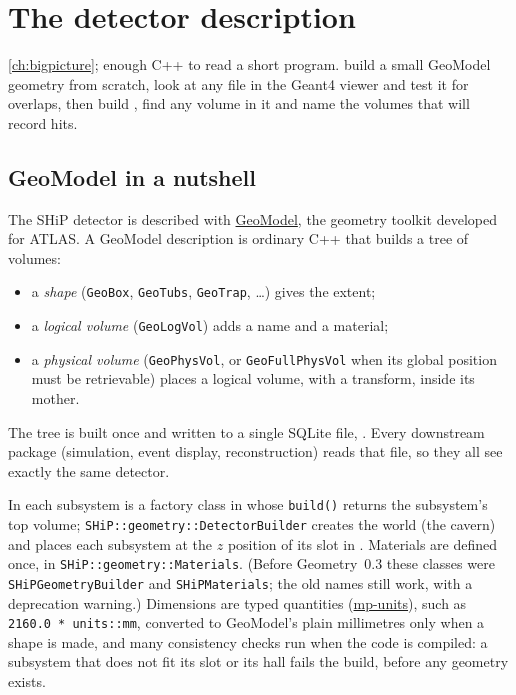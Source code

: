 \chapter{The detector description}
\label{ch:geometry}

{\cref{ch:bigpicture}; enough C++ to read a short program.}
{build a small GeoModel geometry from scratch, look at any  file in
the Geant4 viewer and test it for overlaps, then build ,
find any volume in it and name the volumes that will record hits.}

\section{GeoModel in a nutshell}

The SHiP detector is described with
\href{https://geomodel.web.cern.ch}{GeoModel}, the geometry toolkit developed
for ATLAS. A GeoModel description is ordinary C++ that builds a tree of
volumes:

\begin{itemize}
  \item a \emph{shape} (\texttt{GeoBox}, \texttt{GeoTubs}, \texttt{GeoTrap},
        \ldots) gives the extent;
  \item a \emph{logical volume} (\texttt{GeoLogVol}) adds a name and a
        material;
  \item a \emph{physical volume} (\texttt{GeoPhysVol}, or
        \texttt{GeoFullPhysVol} when its global position must be retrievable)
        places a logical volume, with a transform, inside its mother.
\end{itemize}

The tree is built once and written to a single SQLite file,
. Every downstream package (simulation, event display,
reconstruction) reads that file, so they all see exactly the same detector.

In  each subsystem is a factory class in
 whose \texttt{build()} returns the subsystem's
top volume; \texttt{SHiP::geometry::DetectorBuilder} creates the world (the
cavern) and places each subsystem at the $z$ position of its slot in
. Materials are defined once, in
\texttt{SHiP::geometry::Materials}. (Before Geometry~0.3 these classes were
\texttt{SHiPGeometryBuilder} and \texttt{SHiPMaterials}; the old names still
work, with a deprecation warning.) Dimensions are typed
quantities (\href{https://mpusz.github.io/mp-units/}{mp-units}), such as
\texttt{2160.0 * units::mm}, converted to GeoModel's plain millimetres only
when a shape is made, and many consistency checks run when the code is
compiled: a subsystem that does not fit its slot or its hall fails the build,
before any geometry exists.

